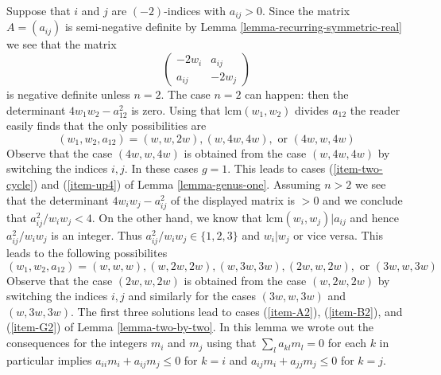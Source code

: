 \medskip\noindent
Suppose that $i$ and $j$ are $(-2)$-indices with $a_{ij} > 0$.
Since the matrix $A = (a_{ij})$ is semi-negative definite by
Lemma \ref{lemma-recurring-symmetric-real} we see that the matrix
$$
\left(
\begin{matrix}
-2w_i & a_{ij} \\
a_{ij} & -2w_j
\end{matrix}
\right)
$$
is negative definite unless $n = 2$. The case $n = 2$ can happen: then
the determinant $4w_1w_2 - a_{12}^2$ is zero. Using that
$\text{lcm}(w_1, w_2)$ divides $a_{12}$ the reader easily finds
that the only possibilities are
$$
(w_1, w_2, a_{12}) = (w, w, 2w), (w, 4w, 4w), \text{ or }(4w, w, 4w)
$$
Observe that the case $(4w, w, 4w)$ is obtained from the case
$(w, 4w, 4w)$ by switching the indices $i, j$.
In these cases $g = 1$. This leads to cases
(\ref{item-two-cycle}) and (\ref{item-up4}) of Lemma \ref{lemma-genus-one}.
Assuming $n > 2$ we see
that the determinant $4w_iw_j - a_{ij}^2$ of the displayed matrix
is $> 0$ and we conclude that $a_{ij}^2/w_iw_j < 4$.
On the other hand, we know that $\text{lcm}(w_i, w_j) | a_{ij}$
and hence $a_{ij}^2/w_iw_j$ is an integer.
Thus $a_{ij}^2/w_iw_j \in \{1, 2, 3\}$ and $w_i | w_j$ or
vice versa. This leads to the following possibilites
$$
(w_1, w_2, a_{12}) = (w, w, w), (w, 2w, 2w), (w, 3w, 3w),
(2w, w, 2w), \text{ or }(3w, w, 3w)
$$
Observe that the case $(2w, w, 2w)$ is obtained from the case
$(w, 2w, 2w)$ by switching the indices $i, j$ and similarly
for the cases $(3w, w, 3w)$ and $(w, 3w, 3w)$. The first three
solutions lead to cases (\ref{item-A2}), (\ref{item-B2}), and
(\ref{item-G2}) of Lemma \ref{lemma-two-by-two}. In this lemma
we wrote out the consequences for the integers $m_i$ and $m_j$
using that $\sum_l a_{kl}m_l = 0$ for each $k$ in particular implies
$a_{ii}m_i + a_{ij}m_j \leq 0$ for $k = i$ and
$a_{ij}m_i + a_{jj}m_j \leq 0$ for $k = j$.


